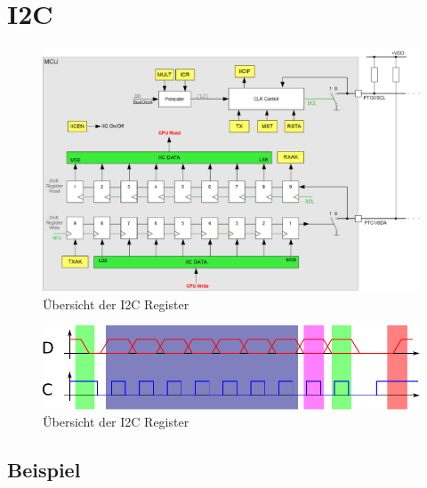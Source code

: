 \newpage
\section{I2C}

\begin{figure}[h!]
	\centering
	\includegraphics[width=1\textwidth]{../fig/i2c.pdf}
	\caption{Übersicht der I2C Register}
\end{figure}

\begin{figure}[h!]
	\centering
	\includegraphics[width=1\textwidth]{../fig/i2c_header.pdf}
	\caption{Übersicht der I2C Register}
\end{figure}



\newpage
\subsection{Beispiel}





